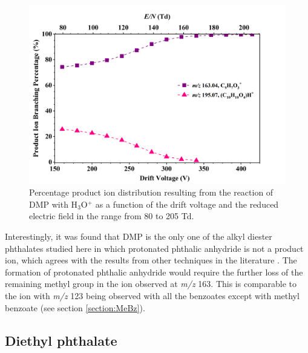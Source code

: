 \begin{figure}[htb]%
\centering
\includegraphics[height=0.35\textheight]{pics/DMP-BR.png}
\caption{Percentage product ion distribution resulting from the reaction of DMP with H$_3$O$^+$ as a function of the drift voltage and the reduced electric field in the range from 80 to 205 Td.}
\label{fig:PH_DMP_fs}
\end{figure}

Interestingly, it was found that DMP is the only one of the alkyl diester phthalates studied here in which protonated phthalic anhydride is not a product ion, which agrees with the results from other techniques in the literature \cite{yin2014mass}.
%
The formation of protonated phthalic anhydride would require the further loss of the remaining methyl group in the ion observed at \textit{m/z} 163.
%
This is comparable to the ion with \textit{m/z} 123 being observed with all the benzoates except with methyl benzoate (see section \ref{section:MeBz}). 
%








\subsection{Diethyl phthalate}


